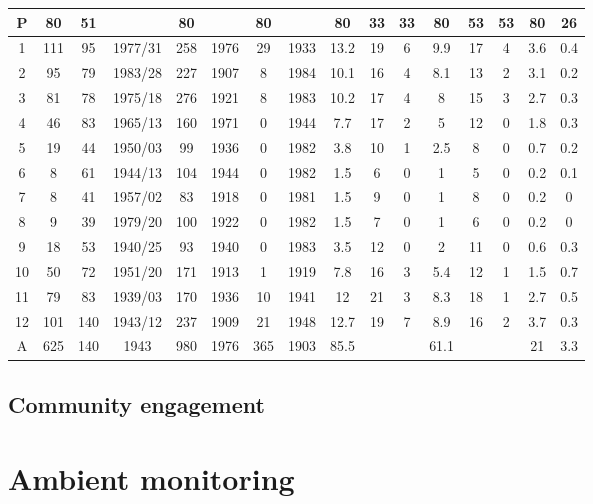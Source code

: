 \documentclass{nwureport}
\begin{document}
\begin{table}
\begin{center}
\begin{tabular}{ c c c c c c c c c c c c c c c c }
\midrule 
P&80&51&&80&&80&&80&33&33&80&53&53&80&26\\
\midrule 
1&111&95&1977/31&258&1976&29&1933&13.2&19&6&9.9&17&4&3.6&0.4\\
2&95&79&1983/28&227&1907&8&1984&10.1&16&4&8.1&13&2&3.1&0.2\\
3&81&78&1975/18&276&1921&8&1983&10.2&17&4&8&15&3&2.7&0.3\\
4&46&83&1965/13&160&1971&0&1944&7.7&17&2&5&12&0&1.8&0.3\\
5&19&44&1950/03&99&1936&0&1982&3.8&10&1&2.5&8&0&0.7&0.2\\
6&8&61&1944/13&104&1944&0&1982&1.5&6&0&1&5&0&0.2&0.1\\
7&8&41&1957/02&83&1918&0&1981&1.5&9&0&1&8&0&0.2&0\\
8&9&39&1979/20&100&1922&0&1982&1.5&7&0&1&6&0&0.2&0\\
9&18&53&1940/25&93&1940&0&1983&3.5&12&0&2&11&0&0.6&0.3\\
10&50&72&1951/20&171&1913&1&1919&7.8&16&3&5.4&12&1&1.5&0.7\\
11&79&83&1939/03&170&1936&10&1941&12&21&3&8.3&18&1&2.7&0.5\\
12&101&140&1943/12&237&1909&21&1948&12.7&19&7&8.9&16&2&3.7&0.3\\
\midrule 
A&625&140&1943&980&1976&365&1903&85.5&&&61.1&&&21&3.3\\
\bottomrule
\end{tabular}
\end{center}
\end{table}

\section{Community engagement}


\chapter{Ambient monitoring}
\end{document}

